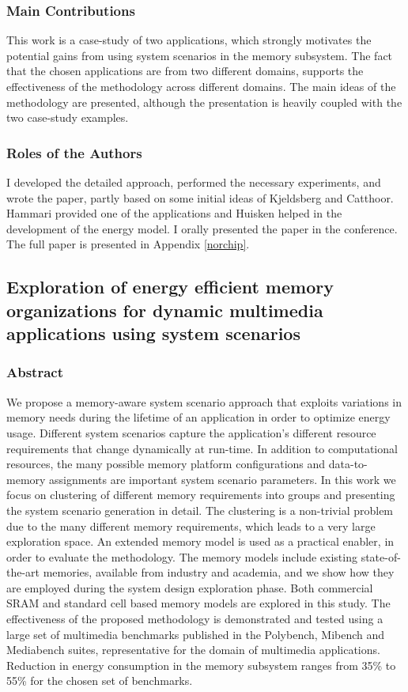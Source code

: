 \subsubsection{Main Contributions}

This work is a case-study of two applications, which strongly motivates the potential gains from using system scenarios in the memory subsystem.
The fact that the chosen applications are from two different domains, supports the effectiveness of the methodology across different domains.
The main ideas of the methodology are presented, although the presentation is heavily coupled with the two case-study examples.

\subsubsection{Roles of the Authors}

I developed the detailed approach, performed the necessary experiments, and wrote the paper, partly based on some initial ideas of Kjeldsberg and Catthoor. 
Hammari provided one of the applications and Huisken helped in the development of the energy model.
I orally presented the paper in the conference.
The full paper is presented in Appendix \ref{norchip}.

\subsection{Exploration of energy efficient memory organizations for dynamic multimedia applications using system scenarios}

\subsubsection{Abstract}

We propose a memory-aware system scenario approach that exploits variations in memory needs during the lifetime of an application in order to optimize energy usage. 
Different system scenarios capture the application's different resource requirements that change dynamically at run-time. 
In addition to computational resources, the many possible memory platform configurations and data-to-memory assignments are important system scenario parameters. 
In this work we focus on clustering of different memory requirements into groups and presenting the system scenario generation in detail.
The clustering is a non-trivial problem due to the many different memory requirements, which leads to a very large exploration space.
An extended memory model is used as a practical enabler, in order to evaluate the methodology. 
The memory models include existing state-of-the-art memories, available from industry and academia, and we show how they are employed during the system design exploration phase. 
Both commercial SRAM and standard cell based memory models are explored in this study. 
The effectiveness of the proposed methodology is demonstrated and tested using a large set of multimedia benchmarks published in the Polybench, Mibench and Mediabench suites,
representative for the domain of multimedia applications.
Reduction in energy consumption in the memory subsystem ranges from 35\% to 55\% for the chosen set of benchmarks.

